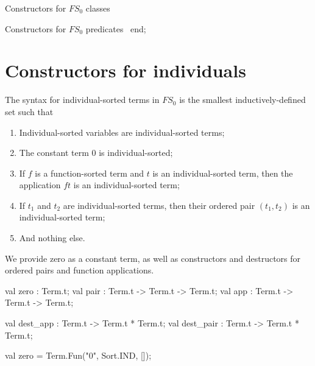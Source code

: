 \LA{}Constructors for $FS_{0}$ classes~{\nwtagstyle{}}\RA{}

\LA{}Constructors for $FS_{0}$ predicates~{\nwtagstyle{}}\RA{}
end;
\nwendcode{}\nwdocspar

\section*{Constructors for individuals}

\begin{node}
The syntax for individual-sorted terms in $FS_{0}$ is the smallest
inductively-defined set such that
\begin{enumerate}
\item Individual-sorted variables are individual-sorted terms;
\item The constant term $0$ is individual-sorted;
\item If $f$ is a function-sorted term and $t$ is an individual-sorted
  term, then the application $ft$ is an individual-sorted term;
\item If $t_{1}$ and $t_{2}$ are individual-sorted terms, then their
  ordered pair $(t_{1},t_{2})$ is an individual-sorted term;
\item And nothing else.
\end{enumerate}
We provide {\Tt{}zero\nwendquote} as a constant term, as well as constructors and
destructors for ordered {\Tt{}pair\nwendquote}s and function {\Tt{}app\nwendquote}lications.
\end{node}

\nwenddocs{}\endmoddef\nwstartdeflinemarkup{}\nwenddeflinemarkup
val zero : Term.t;
val pair : Term.t -> Term.t -> Term.t;
val app : Term.t -> Term.t -> Term.t;

val dest_app : Term.t -> Term.t * Term.t;
val dest_pair : Term.t -> Term.t * Term.t;
\nwendcode{}\nwdocspar

\nwenddocs{}\endmoddef\nwstartdeflinemarkup{}\nwenddeflinemarkup
val zero = Term.Fun("0", Sort.IND, []);


